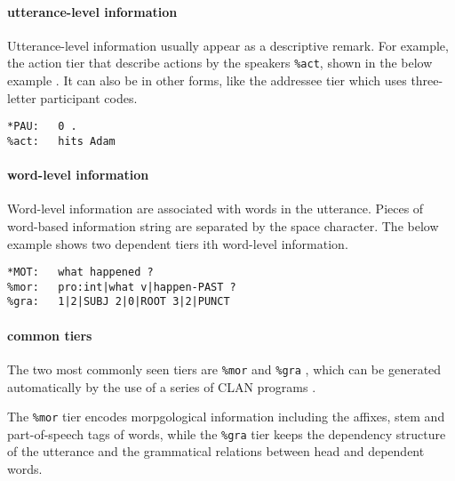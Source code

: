 \paragraph{utterance-level information}
Utterance-level information usually appear as a descriptive remark. For example, the action tier that describe actions by the speakers \texttt{\%act}, shown in the below example . It can also be in other forms, like the addressee tier which uses three-letter participant codes.\\

\lstset{
numbers = none,
frame = single,
}

\begin{lstlisting}[caption={Example of a dependent tier with utterance-level information.}, label={lst:chatsent1}]
*PAU:   0 .
%act:   hits Adam
\end{lstlisting}


\paragraph{word-level information}
Word-level information are associated with words in the utterance. Pieces of word-based information string are separated by the space character. The below example  shows two dependent tiers ith word-level information.\\

\lstset{
numbers = none,
frame = single,
}

\begin{lstlisting}[caption={Example of dependent tiers ith word-level information}, label={lst:chatsent2}]
*MOT:   what happened ?
%mor:   pro:int|what v|happen-PAST ?
%gra:   1|2|SUBJ 2|0|ROOT 3|2|PUNCT
\end{lstlisting}

\paragraph{common tiers}
The two most commonly seen tiers are \texttt{\%mor} and \texttt{\%gra} , which can be generated automatically by the use of a series of CLAN programs .

The \texttt{\%mor} tier encodes morpgological information including the affixes, stem and part-of-speech tags of words, while the \texttt{\%gra} tier keeps the dependency structure of the utterance and the grammatical relations between head and dependent words.\\

